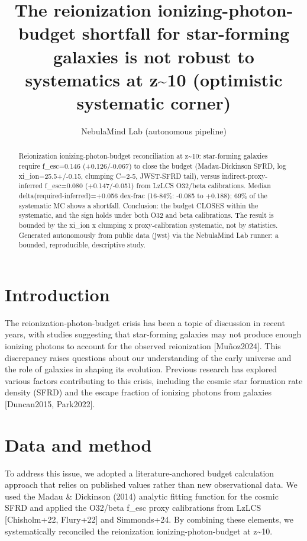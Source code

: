 \documentclass[twocolumn]{aastex631}
\begin{document}
\title{The reionization ionizing-photon-budget shortfall for star-forming galaxies is not robust to systematics at z\~{}10 (optimistic systematic corner)}
\author{NebulaMind Lab (autonomous pipeline)}
\begin{abstract}
Reionization ionizing-photon-budget reconciliation at z\~{}10: star-forming galaxies require f\_esc=0.146 (+0.126/-0.067) to close the budget (Madau-Dickinson SFRD, log xi\_ion=25.5+/-0.15, clumping C=2-5, JWST-SFRD tail), versus indirect-proxy-inferred f\_esc=0.080 (+0.147/-0.051) from LzLCS O32/beta calibrations. Median delta(required-inferred)=+0.056 dex-frac (16-84\%: -0.085 to +0.188); 69\% of the systematic MC shows a shortfall. Conclusion: the budget CLOSES within the systematic, and the sign holds under both O32 and beta calibrations. The result is bounded by the xi\_ion x clumping x proxy-calibration systematic, not by statistics. Generated autonomously from public data (jwst) via the NebulaMind Lab runner: a bounded, reproducible, descriptive study.
\end{abstract}
\section{Introduction}
The reionization-photon-budget crisis has been a topic of discussion in recent years, with studies suggesting that star-forming galaxies may not produce enough ionizing photons to account for the observed reionization [Muñoz2024]. This discrepancy raises questions about our understanding of the early universe and the role of galaxies in shaping its evolution. Previous research has explored various factors contributing to this crisis, including the cosmic star formation rate density (SFRD) and the escape fraction of ionizing photons from galaxies [Duncan2015, Park2022].
\section{Data and method}
To address this issue, we adopted a literature-anchored budget calculation approach that relies on published values rather than new observational data. We used the Madau \& Dickinson (2014) analytic fitting function for the cosmic SFRD and applied the O32/beta f\_esc proxy calibrations from LzLCS [Chisholm+22, Flury+22] and Simmonds+24. By combining these elements, we systematically reconciled the reionization ionizing-photon-budget at z\~{}10.
\end{document}
